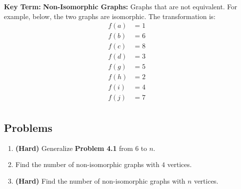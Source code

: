 \documentclass[11pt]{scrartcl}
\begin{document}
\begin{tcolorbox}[colback=vocabcolor!5!white,colframe=vocabcolor!75!black]
  \color{vocabcolor} \textbf{Key Term:} \color{black}
      \textbf{Non-Isomorphic Graphs:} Graphs that are not equivalent. For example, below, the two graphs are isomorphic. The transformation is: 
\begin{align*}
f(a) &= 1 \\
f(b) &= 6 \\
f(c) &= 8 \\
f(d) &= 3 \\
f(g) &= 5 \\
f(h) &= 2 \\
f(i) &= 4 \\
f(j) &= 7 \\
\end{align*}
\end{tcolorbox}

\begin{figure}[h!]
    \centering
\end{figure}

\newpage

\subsection{Problems}
\begin{enumerate}
    \item \textbf{(Hard)} Generalize \color{red} \textbf{Problem 4.1} \color{black} from $6$ to $n$.
    \item Find the number of non-isomorphic graphs with $4$ vertices.
    \item \textbf{(Hard)} Find the number of non-isomorphic graphs with $n$ vertices.
\end{enumerate}
\end{document}
